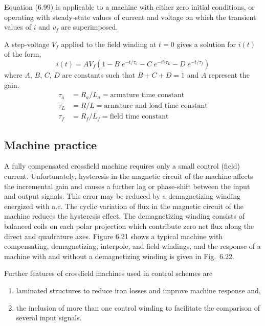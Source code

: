 \documentclass[a4paper,numbers=noenddot,12pt]{scrbook}
\begin{document}
    Equation (6.99) is applicable to a machine with either zero initial conditions, or operating with steady-state values of current and voltage on which the transient values of $i$ and $v_f$ are superimposed.

    A step-voltage $V_f$ applied to the field winding at $t = 0$ gives a solution for $i(t)$ of the form,
    \begin{equation}
        i(t) = A V_f(1 - B \; e^{-t/\tau_a} - C \; e^{-t7\tau_L} - D \; e^{-t/\tau_f})
        \label{eq:Eq6.100}
    \end{equation}
    where $A$, $B$, $C$, $D$ are constants such that $B + C + D = 1$ and $A$ represent the gain.
    \begin{align*}
        \tau_a & = R_a / L_a = \text{armature time constant} \\
        \tau_L & = R / L = \text{armature and load time constant} \\
        \tau_f & = R_f / L_f = \text{field time constant}
    \end{align*}

    \subsection{Machine practice}
    A fully compensated crossfield machine requires only a small control (field) current. Unfortunately, hysteresis in the magnetic circuit of the machine affects the incremental gain and causes a further lag or phase-shift between the input and output signals. This error may be reduced by a demagnetizing winding energized with a.c. The cyclic variation of flux in the magnetic circuit of the machine reduces the hysteresis effect. The demagnetizing winding
    consists of balanced coils on each polar projection which contribute zero net flux along the direct and quadrature axes. Figure 6.21 shows a typical machine with compensating, demagnetizing, interpole, and field windings, and the response of a machine with and without a demagnetizing winding is given in Fig.\ 6.22.

    Further features of crossfield machines used in control schemes are
    \begin{enumerate}
        \item laminated structures to reduce iron losses and improve machine response and,
        \item the inclusion of more than one control winding to facilitate the comparison of several input signals.
    \end{enumerate}
\end{document}
